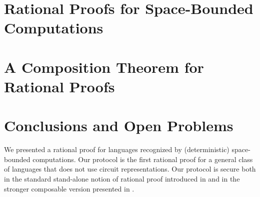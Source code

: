 	
%	
	
	
	
	
	
	\section{Rational Proofs for Space-Bounded Computations }
	
	
	\section{A Composition Theorem for Rational Proofs}
	
		
				
	
	
	
	
	
	
	
	\section{Conclusions and Open Problems}
	We presented a rational proof for languages recognized by (deterministic) 
	space-bounded computations. Our protocol is the first rational proof for a general class of languages that does not use circuit representations. Our protocol is secure both in the standard stand-alone notion of rational proof introduced in 
	\cite{am} and in the stronger composable version presented in \cite{cg15}. 
	
